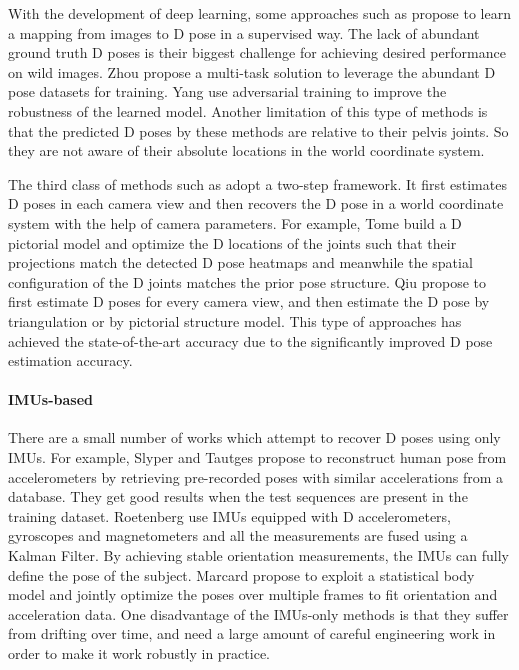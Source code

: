 \documentclass[10pt,twocolumn,letterpaper]{article}
\begin{document}
With the development of deep learning, some approaches such as \cite{Rhodin_2018_ECCV,rhodin2018learning,martinez2017simple,trumble2018deep,jafarian2018monet,pavllo20193d} propose to learn a mapping from images to D pose in a supervised way. The lack of abundant ground truth D poses is their biggest challenge for achieving desired performance on wild images. Zhou \etal \cite{zhou2017towards} propose a multi-task solution to leverage the abundant D pose datasets for training. Yang \etal \cite{yang20183d} use adversarial training to improve the robustness of the learned model. Another limitation of this type of methods is that the predicted D poses by these methods are relative to their pelvis joints. So they are not aware of their absolute locations in the world coordinate system.

The third class of methods such as \cite{amin2013multi,burenius20133D,PavlakosZDD17,belagiannis20143D,gilbert2018volumetric,joo2019panoptic,dong2019fast,qiu2019cross} adopt a two-step framework. It first estimates D poses in each camera view and then recovers the D pose in a world coordinate system with the help of camera parameters. For example, Tome \etal \cite{tome2018rethinking} build a D pictorial model and optimize the D locations of the joints such that their projections match the detected D pose heatmaps and meanwhile the spatial configuration of the D joints matches the prior pose structure. Qiu \etal \cite{qiu2019cross} propose to first estimate D poses for every camera view, and then estimate the D pose by triangulation or by pictorial structure model. This type of approaches has achieved the state-of-the-art accuracy due to the significantly improved D pose estimation accuracy. 


\paragraph{IMUs-based} There are a small number of works which attempt to recover D poses using only IMUs. For example, Slyper \etal \cite{slyper2008action} and  Tautges \etal \cite{tautges2011motion} propose to reconstruct human pose from  accelerometers by retrieving pre-recorded poses with similar accelerations from a database. They get good results when the test sequences are present in the training dataset. Roetenberg \etal \cite{roetenberg2009xsens} use  IMUs equipped with D accelerometers, gyroscopes and magnetometers and all the measurements are fused using a Kalman Filter. By achieving stable orientation measurements, the  IMUs can fully define the pose of the subject. Marcard \etal \cite{von2017sparse} propose to exploit a statistical body model and jointly optimize the poses over multiple frames to fit orientation and acceleration data. One disadvantage of the IMUs-only methods is that they suffer from drifting over time, and need a large amount of careful engineering work in order to make it work robustly in practice.
\end{document}
